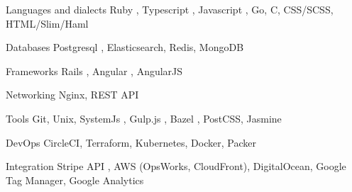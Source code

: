 

\begin{cvskills}

  \cvskill
    {Languages and dialects} %
    {Ruby {\color{awesome-mustard} \faStar}, Typescript {\color{awesome-mustard} \faStar}, Javascript {\color{awesome-mustard} \faStar}, Go, C, CSS/SCSS, HTML/Slim/Haml} %

  \cvskill
    {Databases} %
    {Postgresql {\color{awesome-mustard} \faStar}, Elasticsearch, Redis, MongoDB} %

  \cvskill
    {Frameworks} %
    {Rails {\color{awesome-mustard} \faStar}, Angular {\color{awesome-mustard} \faStar}, AngularJS} %

  \cvskill
    {Networking} %
    {Nginx, REST API {\color{awesome-mustard} \faStar}} %

  \cvskill
    {Tools} %
    {Git, Unix, SystemJs {\color{awesome-mustard} \faStar}, Gulp.js {\color{awesome-mustard} \faStar}, Bazel {\color{awesome-mustard} \faStar}, PostCSS, Jasmine} %

  \cvskill
    {DevOps} %
    {CircleCI, Terraform, Kubernetes, Docker, Packer} %


  \cvskill
    {Integration} %
    {Stripe API {\color{awesome-mustard} \faStar}, AWS (OpsWorks, CloudFront), DigitalOcean, Google Tag Manager, Google Analytics} %


\end{cvskills}

